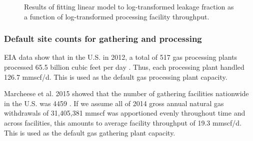 \documentclass[11pt]{report}
\begin{document}
\begin{figure}[tb]
\begin{center}
\hfill
{}
\hfill
\caption{Results of fitting linear model to log-transformed leakage fraction as a function of log-transformed processing facility throughput.}
\label{fig:processing_site_VF_fit}
\end{center}
\end{figure}

\subsubsection{Default site counts for gathering and processing}

EIA data show that in the U.S. in 2012, a total of 517 gas processing plants processed 65.5 billion cubic feet per day \cite{EIA2012}. Thus, each processing plant handled 126.7 mmscf/d. This is used as the default gas processing plant capacity.

Marcheese et al. 2015 \cite{marchese2015} showed that the number of gathering facilities nationwide in the U.S. was 4459 \cite[
SI Table S12]{marchese2015}. If we assume all of 2014 gross annual natural gas withdrawals of 31,405,381 mmscf \cite{EIA2018} was apportioned evenly throughout time and across facilities, this amounts to average facility throughput of 19.3 mmscf/d. This is used as the default gas gathering plant capacity.
\end{document}
